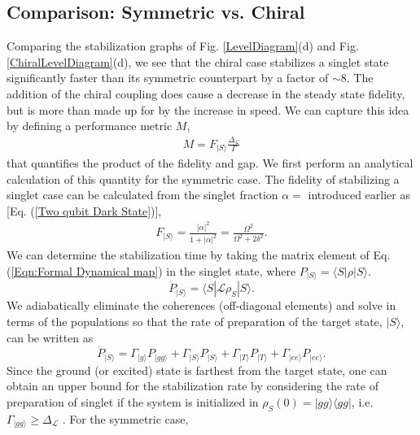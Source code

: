 \subsection{Comparison: Symmetric vs. Chiral}
%
Comparing the stabilization graphs of Fig. \ref{LevelDiagram}(d) and Fig. \ref{ChiralLevelDiagram}(d), we see that the chiral case stabilizes a singlet state significantly faster than its symmetric counterpart by a factor of $\sim8$. The addition of the chiral coupling does cause a decrease in the steady state fidelity, but is more than made up for by the increase in speed. We can capture this idea by defining a performance metric $M$, 
%
\begin{eqnarray}
M = F_{| S \rangle} \frac{\Delta_{\mathcal{L}}}{\Gamma}
\end{eqnarray}
%
that quantifies the product of the fidelity and gap. We first perform an analytical calculation of this quantity for the symmetric case. The fidelity of stabilizing a singlet case can be calculated from the singlet fraction $\alpha = $ introduced earlier as [Eq. (\ref{Two qubit Dark State})], 
%
\begin{eqnarray}
F_{|S\rangle} = \frac{|\alpha|^2}{1+|\alpha|^2} = \frac{\Omega^{2}}{\Omega^{2} + 2\delta^{2}}.
\label{Eq:FidSym}
\end{eqnarray}
%
We can determine the stabilization time by taking the matrix element of Eq. (\ref{Eqn:Formal Dynamical map}) in the singlet state, where $ P_{| S \rangle } = \langle S | \rho | S \rangle$.
%
\begin{equation}
    \dot{P}_{| S \rangle } = \langle S | \mathcal{L} \rho_S | S \rangle.
\end{equation}
%
We adiabatically eliminate the coherences (off-diagonal elements) and solve in terms of the populations so that the rate of preparation of the target state, $|S\rangle$, can be written as \cite{AE_of_coherence, Emery_Paper}
%
\begin{equation}
    \dot{P}_{|S\rangle} = \Gamma_{|g\rangle}P_{|gg\rangle} + \Gamma_{|S\rangle} P_{|S\rangle} + \Gamma_{|T\rangle} P_{|T\rangle} + \Gamma_{|ee \rangle} P_{|ee\rangle}.
\end{equation}
%
Since the ground (or excited) state is farthest from the target state, one can obtain an upper bound for the stabilization rate by considering the rate of preparation of singlet if the system is initialized in $\rho_{S}(0)=|gg\rangle\langle gg|$, i.e. $\Gamma_{|gg\rangle} \geq \Delta_{\mathcal{L}}$ \cite{Emery_Paper}. For the symmetric case,
